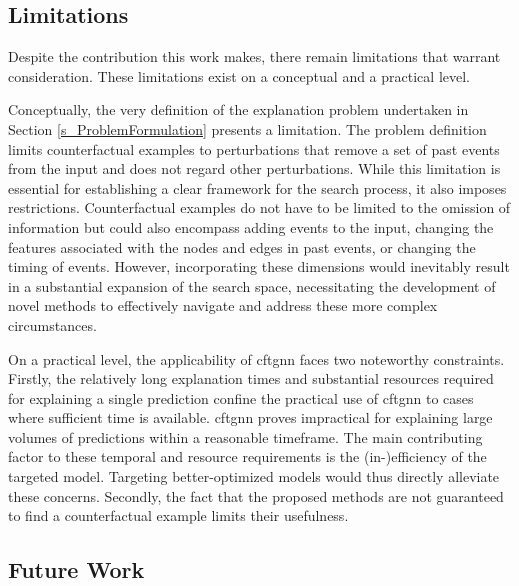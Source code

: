 \subsection{Limitations}
\label{s_Conclusion_Limitations}

Despite the contribution this work makes, there remain limitations that warrant consideration. These limitations exist on a conceptual and a practical level.

Conceptually, the very definition of the explanation problem undertaken in Section \ref{s_ProblemFormulation} presents a limitation. The problem definition limits counterfactual examples to perturbations that remove a set of past events from the input and does not regard other perturbations. While this limitation is essential for establishing a clear framework for the search process, it also imposes restrictions. Counterfactual examples do not have to be limited to the omission of information but could also encompass adding events to the input, changing the features associated with the nodes and edges in past events, or changing the timing of events. However, incorporating these dimensions would inevitably result in a substantial expansion of the search space, necessitating the development of novel methods to effectively navigate and address these more complex circumstances.

On a practical level, the applicability of \gls{cftgnn} faces two noteworthy constraints. Firstly, the relatively long explanation times and substantial resources required for explaining a single prediction confine the practical use of \gls{cftgnn} to cases where sufficient time is available. \gls{cftgnn} proves impractical for explaining large volumes of predictions within a reasonable timeframe. The main contributing factor to these temporal and resource requirements is the (in-)efficiency of the targeted model. Targeting better-optimized models would thus directly alleviate these concerns. Secondly, the fact that the proposed methods are not guaranteed to find a counterfactual example limits their usefulness. 





\subsection{Future Work}
\label{s_Conclusion_FutureWork}

